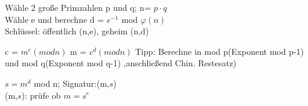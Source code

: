 \begin{multicols}{2}
Wähle 2 große Primzahlen p und q; n= $p \cdot q$\\
Wähle e und berechne d = $e^{-1}$ mod $\varphi(n)$\\
Schlüssel: öffentlich (n,e), geheim (n,d)

c = $m^e (mod n)$
m = $c^d (mod n)$ Tipp: Berechne in mod p(Exponent mod p-1) und mod q(Exponent mod q-1) ,anschließend Chin. Restesatz)
\end{multicols}

\begin{multicols}{2}
$s = m^d$ mod n; 	Signatur:(m,$s$)\\

(m,$s$): prüfe ob $m = s^e$\\
\end{multicols}




